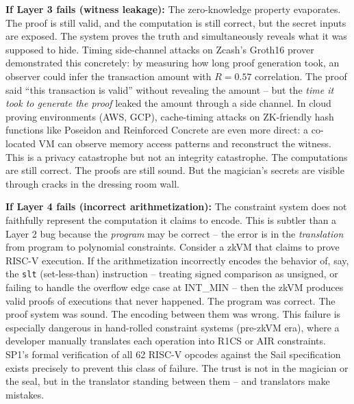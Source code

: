 \documentclass[
  11pt,
  openany]{report}
\renewcommand{\textbf}[1]{{\bfseries\color{MidnightBold}#1}}
\begin{document}
\textbf{If Layer 3 fails (witness leakage):} The zero-knowledge property
evaporates. The proof is still valid, and the computation is still correct, but
the secret inputs are exposed. The system proves the truth and simultaneously
reveals what it was supposed to hide. Timing side-channel attacks on Zcash's
Groth16 prover demonstrated this concretely: by measuring how long proof
generation took, an observer could infer the transaction amount with
\(R = 0.57\) correlation. The proof said ``this transaction is valid'' without
revealing the amount -- but the \emph{time it took to generate the proof} leaked
the amount through a side channel. In cloud proving environments (AWS, GCP),
cache-timing attacks on ZK-friendly hash functions like Poseidon and Reinforced
Concrete are even more direct: a co-located VM can observe memory access
patterns and reconstruct the witness. This is a privacy catastrophe but not an
integrity catastrophe. The computations are still correct. The proofs are still
sound. But the magician's secrets are visible through cracks in the dressing
room wall.

\textbf{If Layer 4 fails (incorrect arithmetization):} The constraint system
does not faithfully represent the computation it claims to encode. This is
subtler than a Layer 2 bug because the \emph{program} may be correct -- the
error is in the \emph{translation} from program to polynomial constraints.
Consider a zkVM that claims to prove RISC-V execution. If the arithmetization
incorrectly encodes the behavior of, say, the \texttt{slt} (set-less-than)
instruction -- treating signed comparison as unsigned, or failing to handle the
overflow edge case at INT\_MIN -- then the zkVM produces valid proofs of
executions that never happened. The program was correct. The proof system was
sound. The encoding between them was wrong. This failure is especially dangerous
in hand-rolled constraint systems (pre-zkVM era), where a developer manually
translates each operation into R1CS or AIR constraints. SP1's formal
verification of all 62 RISC-V opcodes against the Sail specification exists
precisely to prevent this class of failure. The trust is not in the magician or
the seal, but in the translator standing between them -- and translators make
mistakes.
\end{document}
